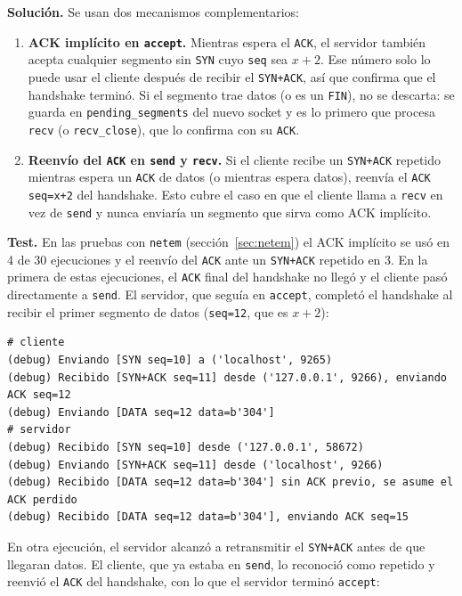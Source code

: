 \documentclass[11pt,letterpaper]{article}
\begin{document}
\textbf{Solución.} Se usan dos mecanismos complementarios:

\begin{enumerate}[nosep]
  \item \textbf{ACK implícito en \texttt{accept}.} Mientras espera el \texttt{ACK}, el
        servidor también acepta cualquier segmento sin \texttt{SYN} cuyo \texttt{seq} sea
        $x+2$. Ese número solo lo puede usar el cliente después de recibir el
        \texttt{SYN+ACK}, así que confirma que el handshake terminó. Si el segmento trae
        datos (o es un \texttt{FIN}), no se descarta: se guarda en
        \texttt{pending\_segments} del nuevo socket y es lo primero que procesa
        \texttt{recv} (o \texttt{recv\_close}), que lo confirma con su \texttt{ACK}.
  \item \textbf{Reenvío del \texttt{ACK} en \texttt{send} y \texttt{recv}.} Si el
        cliente recibe un \texttt{SYN+ACK} repetido mientras espera un \texttt{ACK} de
        datos (o mientras espera datos), reenvía el \texttt{ACK seq=x+2} del handshake.
        Esto cubre el caso en que el cliente llama a \texttt{recv} en vez de
        \texttt{send} y nunca enviaría un segmento que sirva como ACK implícito.
\end{enumerate}

\textbf{Test.} En las pruebas con \texttt{netem} (sección~\ref{sec:netem}) el ACK
implícito se usó en 4 de 30 ejecuciones y el reenvío del \texttt{ACK} ante un
\texttt{SYN+ACK} repetido en 3. En la primera de estas ejecuciones, el \texttt{ACK} final
del handshake no llegó y el cliente pasó directamente a \texttt{send}. El servidor, que
seguía en \texttt{accept}, completó el handshake al recibir el primer segmento de datos
(\texttt{seq=12}, que es $x+2$):

\begin{lstlisting}
# cliente
(debug) Enviando [SYN seq=10] a ('localhost', 9265)
(debug) Recibido [SYN+ACK seq=11] desde ('127.0.0.1', 9266), enviando ACK seq=12
(debug) Enviando [DATA seq=12 data=b'304']
# servidor
(debug) Recibido [SYN seq=10] desde ('127.0.0.1', 58672)
(debug) Enviando [SYN+ACK seq=11] desde ('localhost', 9266)
(debug) Recibido [DATA seq=12 data=b'304'] sin ACK previo, se asume el ACK perdido
(debug) Recibido [DATA seq=12 data=b'304'], enviando ACK seq=15
\end{lstlisting}

En otra ejecución, el servidor alcanzó a retransmitir el \texttt{SYN+ACK} antes de que
llegaran datos. El cliente, que ya estaba en \texttt{send}, lo reconoció como repetido y
reenvió el \texttt{ACK} del handshake, con lo que el servidor terminó \texttt{accept}:
\end{document}
